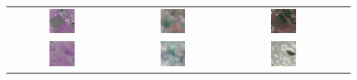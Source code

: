 \begin{figure}[h!]
    \centering
    \setlength{\tabcolsep}{2pt}
    \renewcommand{\arraystretch}{1.0}
    \begin{tabular}{c *{3}{c}}
        \includegraphics[width=0.25\textwidth]{img/seasons/spring/sample_000011_sar_pseudo.png} &
        \includegraphics[width=0.25\textwidth]{img/seasons/spring/sample_000011_pred_rgb.png} &
        \includegraphics[width=0.25\textwidth]{img/seasons/spring/sample_000011_true_rgb.png} \\
        
        \includegraphics[width=0.25\textwidth]{img/seasons/spring/sample_000008_sar_pseudo.png} &
        \includegraphics[width=0.25\textwidth]{img/seasons/spring/sample_000008_pred_rgb.png} &
        \includegraphics[width=0.25\textwidth]{img/seasons/spring/sample_000008_true_rgb.png} \\
        

\end{tabular}
\end{figure}
